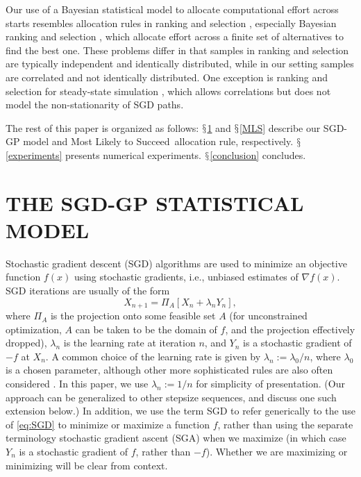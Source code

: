 \documentclass[12pt,english]{article}
\newcommand{\name}{Most Likely to Succeed}
\begin{document}
Our use of a Bayesian statistical model to allocate computational effort across starts resembles allocation rules in ranking and selection \citep{Bechhofer:1995,kim:2007,kim:20062}, especially Bayesian ranking and selection \citep{frazier2009knowledge}, which allocate effort across a finite set of alternatives to find the best one.  These problems differ in that samples in ranking and selection are typically independent and identically distributed, while in our setting samples are correlated and not identically distributed.  One exception is ranking and selection for steady-state simulation \cite{goldsman2002ranking,kim2006asymptotic}, which allows correlations but does not model the non-stationarity of SGD paths.

The rest of this paper is organized as follows: $\mathsection$\ref{statistical_model} and $\mathsection$\ref{MLS} describe our SGD-GP model and \name\ allocation rule, respectively. $\mathsection$\ref{experiments} presents numerical experiments. $\mathsection$\ref{conclusion} concludes.

\section{THE SGD-GP STATISTICAL MODEL}
\label{statistical_model}

Stochastic gradient descent (SGD) algorithms are used to minimize an objective function $f(x)$ using stochastic gradients, i.e., unbiased estimates of $\nabla f(x)$. SGD iterations are usually of the form
\begin{equation}
X_{n+1}=\Pi_{A}\left[X_{n}+\lambda_{n}Y_{n}\right],\label{eq:SGD}
\end{equation}
where $\Pi_{A}$ is the projection onto some feasible set $A$ (for unconstrained optimization, $A$ can be taken to be the domain of $f$, and the projection effectively dropped),
$\lambda_{n}$ is the learning rate at iteration $n$, and $Y_{n}$ is a stochastic gradient of $-f$ at $X_{n}$.  A common choice of the learning rate is given by $\lambda_{n}:=\lambda_{0}/n$, where $\lambda_{0}$ is a chosen parameter, although other more sophisticated rules are also often considered \citep{powell2007approximate}. In this paper, we use  $\lambda_{n}:=1/n$ for simplicity of presentation. (Our approach can be generalized to other stepsize sequences, and discuss one such extension below.)  In addition, we use the term SGD to refer generically to the use of \eqref{eq:SGD} to minimize or maximize a function $f$, rather than using the separate terminology stochastic gradient ascent (SGA) when we maximize (in which case $Y_n$ is a stochastic gradient of $f$, rather than $-f$).  Whether we are maximizing or minimizing will be clear from context.
\end{document}
